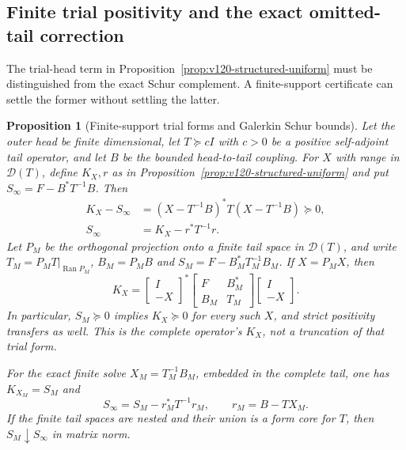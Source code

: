 \documentclass[11pt]{article}
\newtheorem{proposition}[theorem]{Proposition}
\theoremstyle{remark}
\begin{document}
\subsection{Finite trial positivity and the exact omitted-tail correction}

The trial-head term in Proposition~\ref{prop:v120-structured-uniform}
must be distinguished from the exact Schur complement. A finite-support
certificate can settle the former without settling the latter.

\begin{proposition}[Finite-support trial forms and Galerkin Schur bounds]
\label{prop:v121-finite-trial}
Let the outer head be finite dimensional, let $T\succeq cI$ with
$c>0$ be a positive self-adjoint tail operator, and let $B$ be the
bounded head-to-tail coupling. For $X$ with range in $\mathcal D(T)$,
define $K_X,r$ as in Proposition~\ref{prop:v120-structured-uniform}
and put $S_\infty=F-B^*T^{-1}B$. Then
\begin{align}
 K_X-S_\infty
  &=(X-T^{-1}B)^*T(X-T^{-1}B)\succeq0,
       \label{eq:v121-square}\\
 S_\infty&=K_X-r^*T^{-1}r.\label{eq:v121-residual}
\end{align}
Let $P_M$ be the orthogonal projection onto a finite tail space in $\mathcal D(T)$, and
write $T_M=P_MT|_{\operatorname{Ran}P_M}$, $B_M=P_MB$ and
$S_M=F-B_M^*T_M^{-1}B_M$. If $X=P_MX$, then
\begin{equation}\label{eq:v121-finite-trial}
 K_X=\begin{bmatrix}I\\-X\end{bmatrix}^{*}
       \begin{bmatrix}F&B_M^*\\B_M&T_M\end{bmatrix}
       \begin{bmatrix}I\\-X\end{bmatrix}.
\end{equation}
In particular, $S_M\succeq0$ implies $K_X\succeq0$ for every such
$X$, and strict positivity transfers as well. This is the complete
operator's $K_X$, not a truncation of that trial form.

For the exact finite solve $X_M=T_M^{-1}B_M$, embedded in the complete
tail, one has $K_{X_M}=S_M$ and
\begin{equation}\label{eq:v121-galerkin-defect}
 \boxed{S_\infty=S_M-r_M^*T^{-1}r_M,
 \qquad r_M=B-TX_M.}
\end{equation}
If the finite tail spaces are nested and their union is a form core
for $T$, then $S_M\downarrow S_\infty$ in matrix norm.
\end{proposition}
\end{document}
